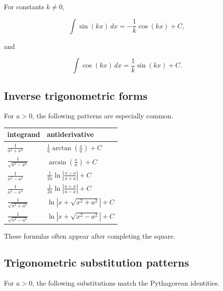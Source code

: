 For constants \(k\neq0\),

\[
\int \sin(kx)\,dx=-\frac1k\cos(kx)+C,
\]

and

\[
\int \cos(kx)\,dx=\frac1k\sin(kx)+C.
\]

\subsection{Inverse trigonometric forms}
\label{appsubsec:inverse-trig-integral-forms}

For \(a>0\), the following patterns are especially common.

\begin{center}
\renewcommand{\arraystretch}{2.1}
\begin{tabular}{p{}|p{}}
\textbf{integrand} & \textbf{antiderivative} \\ \hline

\(\displaystyle \frac1{a^2+x^2}\) &
\(\displaystyle \frac1a\arctan\left(\frac{x}{a}\right)+C\) \\

\(\displaystyle \frac1{\sqrt{a^2-x^2}}\) &
\(\displaystyle \arcsin\left(\frac{x}{a}\right)+C\) \\

\(\displaystyle \frac1{x^2-a^2}\) &
\(\displaystyle
\frac1{2a}\ln\left|\frac{x-a}{x+a}\right|+C
\) \\

\(\displaystyle \frac1{a^2-x^2}\) &
\(\displaystyle
\frac1{2a}\ln\left|\frac{a+x}{a-x}\right|+C
\) \\

\(\displaystyle \frac1{\sqrt{x^2+a^2}}\) &
\(\displaystyle
\ln\left|x+\sqrt{x^2+a^2}\right|+C
\) \\

\(\displaystyle \frac1{\sqrt{x^2-a^2}}\) &
\(\displaystyle
\ln\left|x+\sqrt{x^2-a^2}\right|+C
\)
\end{tabular}
\end{center}

These formulas often appear after completing the square.

\subsection{Trigonometric substitution patterns}
\label{appsubsec:trig-substitution-patterns}

For \(a>0\), the following substitutions match the Pythagorean identities.

